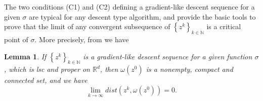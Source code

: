 \documentclass[12pt]{article}
\numberwithin{equation}{section}
\newtheorem{lemma}{Lemma}[proposition]
\newcommand{\nn}{\mathbb{N}} %
\newcommand{\rr}{\mathbb{R}} %
\newcommand{\norm}[1]{\left\Vert {#1} \right\Vert} %
\begin{document}
The two conditions (C1) and (C2) defining a gradient-like descent sequence for a given $\sigma$ are typical for any descent type algorithm, and provide the basic tools to prove that the limit of any convergent subsequence of $\left\lbrace z^k \right\rbrace_{k \in \nn}$ is a critical point of $\sigma$. More precisely, from \cite{BST2014} we have

\begin{lemma}
If $\left\lbrace z^k \right\rbrace_{k \in \nn}$ is a gradient-like descent sequence for a given function $\sigma$, which is lsc and proper on $\rr^d$, then $\omega\left(z^0\right)$ is a nonempty, compact and connected set, and we have
\begin{equation*}
	\lim_{k\rightarrow \infty} dist\left( z^k, \omega\left(z^0\right)\right) = 0.
\end{equation*}
\end{lemma}

\end{document}
